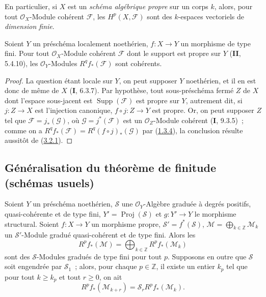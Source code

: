 En particulier, si $X$ est un \emph{schéma algébrique propre} sur un corps
$k$, alors, pour tout $\mathcal O_X$-Module cohérent $\mathcal F$, les
$H^p(X,\mathcal F)$ sont des $k$-espaces vectoriels de \emph{dimension
finie}.

\begin{corollary}[3.2.4]
\label{III.3.2.4-fr}
Soient $Y$ un préschéma localement noethérien, $f:X\to Y$ un morphisme de
type fini. Pour tout $\mathcal O_X$-Module cohérent $\mathcal F$ dont le
support est propre sur $Y$ (\textbf{II}, 5.4.10), les $\mathcal O_Y$-Modules
$R^qf_*(\mathcal F)$ sont cohérents.
\end{corollary}

\begin{proof}
La question étant locale sur $Y$, on peut supposer $Y$ noethérien, et il en
est donc de même de $X$ (\textbf{I}, 6.3.7). Par hypothèse, tout sous-préschéma fermé
$Z$ de $X$ dont l'espace sous-jacent est $\operatorname{Supp}(\mathcal F)$
est propre sur $Y$, autrement dit, si $j:Z\to X$ est l'injection canonique,
$f\circ j:Z\to Y$ est propre. Or, on peut supposer $Z$ tel que
$\mathcal F=j_*(\mathcal G)$, où $\mathcal G=j^*(\mathcal F)$ est un
$\mathcal O_Z$-Module cohérent (\textbf{I}, 9.3.5)~; comme on a
$R^qf_*(\mathcal F)=R^q(f\circ j)_*(\mathcal G)$ par
(\hyperref[III.1.3.4-fr]{1.3.4}), la conclusion résulte aussitôt de
(\hyperref[III.3.2.1-fr]{3.2.1}).
\end{proof}

\subsection{Généralisation du théorème de finitude (schémas usuels)}
\label{subsection:III.3.3-fr}

\begin{proposition}[3.3.1]
\label{III.3.3.1-fr}
Soient $Y$ un préschéma noethérien, $\mathcal S$ une
$\mathcal O_Y$-Algèbre graduée à degrés positifs, quasi-cohérente et de type
fini, $Y'=\operatorname{Proj}(\mathcal S)$ et $g:Y'\to Y$ le morphisme
structural. Soient $f:X\to Y$ un morphisme propre,
$\mathcal S'=f^*(\mathcal S)$,
$\mathcal M=\bigoplus_{k\in\mathbb Z}\mathcal M_k$ un $\mathcal S'$-Module
gradué quasi-cohérent et de type fini. Alors les
\[
R^pf_*(\mathcal M)=\bigoplus_{k\in\mathbb Z}R^pf_*(\mathcal M_k)
\]
sont des $\mathcal S$-Modules gradués de type fini pour tout $p$. Supposons
en outre que $\mathcal S$ soit engendrée par $\mathcal S_1$~; alors, pour
chaque $p\in\mathbb Z$, il existe un entier $k_p$ tel que pour tout
$k\geq k_p$ et tout $r\geq0$, on ait
\[
R^pf_*(\mathcal M_{k+r})=\mathcal S_rR^pf_*(\mathcal M_k).
\tag{3.3.1.1}\label{III.3.3.1.1-fr}
\]
\end{proposition}

